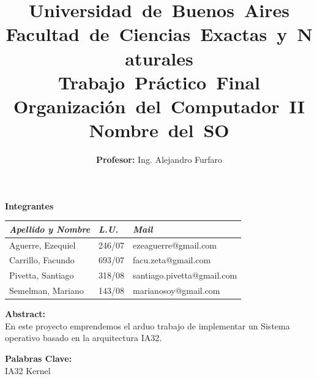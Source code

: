 \documentclass[a4paper,10pt]{article}
\begin{document}
 
\title{
	\mbox{\Huge Universidad de Buenos Aires}\\
	\mbox{\huge Facultad de Ciencias Exactas y Naturales}\\
	\vspace{20mm}
	\mbox{\textbf{Trabajo Pr\'actico Final}}\\
	\mbox{\textbf{Organización del Computador II}}\\
	\mbox{\textbf{Nombre del SO}}\\
	\vspace{8mm}
}
\author{\Large\textbf{Profesor:} Ing. Alejandro Furfaro}
\date{}
\maketitle \thispagestyle{empty}

\begin{center}
    \vspace{15mm}
    \textbf{Integrantes}\\

    \begin{tabular}{|l|l|l|}
        \hline
        \textit{Apellido y Nombre} & \textit{L.U.} & \textit{Mail} \\
        \hline
		Aguerre, Ezequiel & 246/07 & ezeaguerre@gmail.com \\
        \hline
		Carrillo, Facundo & 693/07 & facu.zeta@gmail.com \\
	    \hline
		Pivetta, Santiago & 318/08 & santiago.pivetta@gmail.com \\
        \hline
		Semelman, Mariano & 143/08 & marianosoy@gmail.com \\
        \hline
    \end{tabular}
\end{center}


\begin{center}
    \vspace{10mm}
    \textbf{Abstract:}\\    
   En este proyecto emprendemos el arduo trabajo de implementar un Sistema operativo basado en la arquitectura IA32.
    \vspace{5mm}
\end{center}

\begin{center}
    \vspace{5mm}
    \textbf{Palabras Clave:}\\
		IA32 Kernel
    \vspace{5mm}
\end{center}
\end{document}

